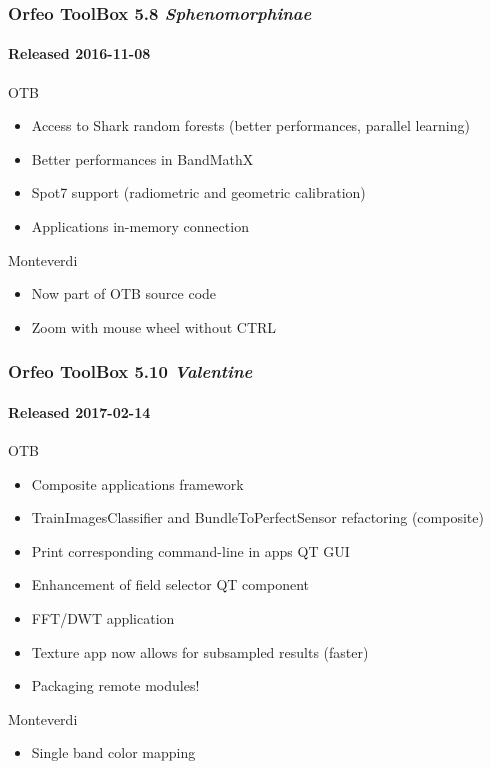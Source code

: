 \documentclass[smaller]{beamer}
\begin{document}
\begin{frame}
\frametitle{Orfeo ToolBox 5.8 \textit{Sphenomorphinae}}
\framesubtitle{Released 2016-11-08}
\begin{block}{OTB}
\begin{itemize}
\item Access to Shark random forests (better performances, parallel learning)
\item Better performances in BandMathX
\item Spot7 support (radiometric and geometric calibration)
\item Applications in-memory connection
\end{itemize}
\end{block}

\begin{block}{Monteverdi}
\begin{itemize}
\item Now part of OTB source code
\item Zoom with mouse wheel without CTRL
\end{itemize}
\end{block}
\end{frame}


\begin{frame}
\frametitle{Orfeo ToolBox 5.10 \textit{Valentine}}
\framesubtitle{Released 2017-02-14}
  \begin{block}{OTB}
    \begin{itemize}
      \item Composite applications framework
      \item TrainImagesClassifier and BundleToPerfectSensor refactoring (composite)
      \item Print corresponding command-line in apps QT GUI
      \item Enhancement of field selector QT component
      \item FFT/DWT application
      \item Texture app now allows for subsampled results (faster)
      \item Packaging remote modules!
    \end{itemize}
  \end{block}

  \begin{block}{Monteverdi}
    \begin{itemize}
      \item Single band color mapping
      \end{itemize}
  \end{block}

\end{frame}
\end{document}
